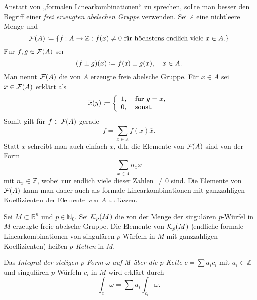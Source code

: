 \documentclass[a4paper,twoside,DIV15,BCOR12mm]{scrbook}
\begin{document}
\noindent
Anstatt von „formalen Linearkombinationen“ zu sprechen, sollte man 
besser den Begriff einer {\em frei erzeugten abelschen Gruppe} verwenden. 
Sei $A$ eine nichtleere Menge und
\[ {\cal F}(A) \da  \{f: A \to {\mathbb Z}: f(x) \not= 0 \mbox{ für 
höchstens endlich viele } x \in A.\} \]
Für $f, g \in {\cal F}(A)$ sei
\[ (f \pm g)(x) \da  f(x) \pm g(x), \quad x \in A. \]
Man nennt ${\cal F}(A)$ die von $A$ erzeugte freie abelsche Gruppe. 
Für $x \in A$ sei $\overline{x} \in {\cal F}(A)$ erklärt als
\[ \overline{x}(y) \da  \left\{ \begin{array}{ll} 1, & \mbox{ für } 
y = x, \\ 0, & \mbox{ sonst.} \end{array} \right. \]
Somit gilt für $f \in {\cal F}(A)$ gerade
\[ f = \sum_{x \in A} f(x) \overline{x}. \]
Statt $\overline{x}$ schreibt man auch einfach $x$, d.h. die Elemente 
von ${\cal F}(A)$ sind von der Form
\[ \sum_{x \in A} n_{x} x \]
mit $n_{x} \in {\mathbb Z}$, wobei nur endlich viele dieser Zahlen 
$\not= 0$ sind. Die Elemente von ${\cal F}(A)$ kann man daher auch 
als formale Linearkombinationen mit ganzzahligen Koeffizienten der 
Elemente von $A$ auffassen.

\bigskip

 Sei $M \subset {\mathbb R}^{n}$ und $p 
\in {\mathbb N}_{0}$. Sei ${\cal K}_{p}(M)$ die von der Menge der 
singulären $p$-Würfel in $M$ erzeugte freie abelsche Gruppe. Die 
Elemente von ${\cal K}_{p}(M)$ (endliche formale Linearkombinationen 
von singulären $p$-Würfeln in $M$ mit ganzzahligen Koeffizienten) 
heißen {\em $p$-Ketten} in $M$.

\bigskip

 Das {\em Integral der stetigen $p$-Form 
$\omega$ auf $M$ über die $p$-Kette} $c = \sum a_{i}c_{i}$ mit $a_{i} 
\in {\mathbb Z}$ und singulären $p$-Würfeln $c_{i}$ in $M$ wird erklärt 
durch
\[ \int_{c} \omega = \sum a_{i} \int_{c_{i}} \omega. \]

\bigskip

\\
\end{document}

